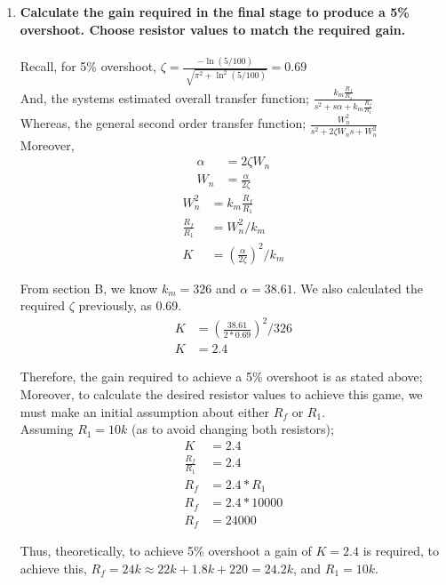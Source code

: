 \documentclass[11pt,a4paper]{article}
\begin{document}
\begin{enumerate}
    
    \pagebreak
	\item \textbf{Calculate the gain required in the final stage to produce a 5\% overshoot. Choose resistor values to match the required gain.} \\\\
    Recall, for 5\% overshoot, $\zeta = \frac{-\ln(5/100)}{\sqrt[]{\pi^2+\ln^2(5/100)}} = 0.69$\\
    And, the systems estimated overall transfer function; $\frac{k_m\frac{R_f}{R_1}}{s^2 + s\alpha + k_m\frac{R_f}{R_1}}$\\
    Whereas, the general second order transfer function; $\frac{W_n^2}{s^2 + 2\zeta W_n s + W_n^2}$\\
    Moreover, 
    \begin{align*}
	\alpha &= 2\zeta W_n\\
    W_n &= \frac{\alpha}{2\zeta}
	\end{align*}
    \begin{align*}
	W_n^2 &= k_m\frac{R_f}{R_1}\\
    \frac{R_f}{R_1} &= W_n^2/k_m\\
    K &= (\frac{\alpha}{2\zeta})^2/k_m
	\end{align*}
    
    From section B, we know $k_m = 326$ and $\alpha = 38.61$. We also calculated the required $\zeta$ previously, as 0.69. 
    \begin{align*}
    K &= (\frac{38.61}{2*0.69})^2/326\\
    K &= 2.4
	\end{align*}
    
    Therefore, the gain required to achieve a 5\% overshoot is as stated above; Moreover, to calculate the desired resistor values to achieve this game, we must make an initial assumption about either $R_f$ or $R_1$. \\
    Assuming $R_1 = 10k$ (as to avoid changing both resistors);
    \begin{align*}
    K &= 2.4 \\
    \frac{R_f}{R_1} &= 2.4 \\
    R_f &= 2.4*R_1 \\
    R_f &= 2.4*10 000 \\
    R_f &= 24 000 
	\end{align*}
    
    Thus, theoretically, to achieve 5\% overshoot a gain of $K = 2.4$ is required, to achieve this, $R_f = 24k \approx 22k + 1.8k + 220 = 24.2k$, and $R_1 = 10k$. 
    

\end{enumerate}
\end{document}
